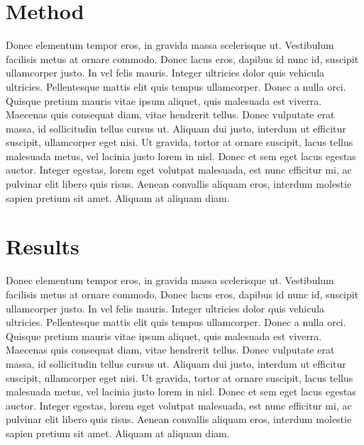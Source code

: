 \documentclass[a4paper, 11pt]{article}
\begin{document}
\begin{multicols}{2}
\section{Method}
Donec elementum tempor eros, in gravida massa scelerisque ut. Vestibulum facilisis metus at ornare commodo. Donec lacus eros, dapibus id nunc id, suscipit ullamcorper justo. In vel felis mauris. Integer ultricies dolor quis vehicula ultricies. Pellentesque mattis elit quis tempus ullamcorper. Donec a nulla orci. Quisque pretium mauris vitae ipsum aliquet, quis malesuada est viverra. Maecenas quis consequat diam, vitae hendrerit tellus. Donec vulputate erat massa, id sollicitudin tellus cursus ut. Aliquam dui justo, interdum ut efficitur suscipit, ullamcorper eget nisi. Ut gravida, tortor at ornare suscipit, lacus tellus malesuada metus, vel lacinia justo lorem in nisl. Donec et sem eget lacus egestas auctor. Integer egestas, lorem eget volutpat malesuada, est nunc efficitur mi, ac pulvinar elit libero quis risus. Aenean convallis aliquam eros, interdum molestie sapien pretium sit amet. Aliquam at aliquam diam.


\section{Results}
Donec elementum tempor eros, in gravida massa scelerisque ut. Vestibulum facilisis metus at ornare commodo. Donec lacus eros, dapibus id nunc id, suscipit ullamcorper justo. In vel felis mauris. Integer ultricies dolor quis vehicula ultricies. Pellentesque mattis elit quis tempus ullamcorper. Donec a nulla orci. Quisque pretium mauris vitae ipsum aliquet, quis malesuada est viverra. Maecenas quis consequat diam, vitae hendrerit tellus. Donec vulputate erat massa, id sollicitudin tellus cursus ut. Aliquam dui justo, interdum ut efficitur suscipit, ullamcorper eget nisi. Ut gravida, tortor at ornare suscipit, lacus tellus malesuada metus, vel lacinia justo lorem in nisl. Donec et sem eget lacus egestas auctor. Integer egestas, lorem eget volutpat malesuada, est nunc efficitur mi, ac pulvinar elit libero quis risus. Aenean convallis aliquam eros, interdum molestie sapien pretium sit amet. Aliquam at aliquam diam.


\end{multicols}
\end{document}
